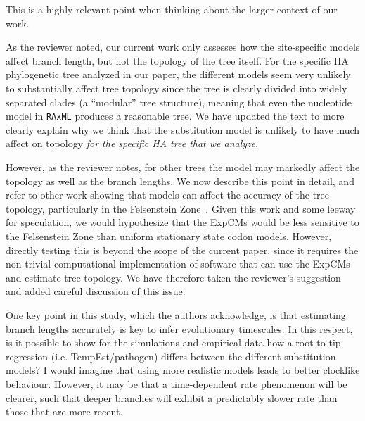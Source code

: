 \documentclass[11pt, oneside]{article}   	%
\newcommand{\response}[1]{{\color{black}#1}}
\begin{document}
\response{This is a highly relevant point when thinking about the larger context of our work. 

As the reviewer noted, our current work only assesses how the site-specific models affect branch length, but not the topology of the tree itself. 
For the specific HA phylogenetic tree analyzed in our paper, the different models seem very unlikely to substantially affect tree topology since the tree is clearly divided into widely separated clades (a ``modular'' tree structure), meaning that even the nucleotide model in \texttt{RAxML} produces a reasonable tree. 
We have updated the text to more clearly explain why we think that the substitution model is unlikely to have much affect on topology \emph{for the specific HA tree that we analyze}. 

However, as the reviewer notes, for other trees the model may markedly affect the topology as well as the branch lengths.
We now describe this point in detail, and refer to other work showing that models can affect the accuracy of the tree topology, particularly in the Felsenstein Zone~\citep{lartillot2007suppression}. 
Given this work and some leeway for speculation, we would hypothesize that the ExpCMs would be less sensitive to the Felsenstein Zone than uniform stationary state codon models.
However, directly testing this is beyond the scope of the current paper, since it requires the non-trivial computational implementation of software that can use the ExpCMs and estimate tree topology.
We have therefore taken the reviewer's suggestion and added careful discussion of this issue.
}

One key point in this study, which the authors acknowledge, is that estimating branch lengths accurately is key to infer evolutionary timescales. 
In this respect, is it possible to show for the simulations and empirical data how a root-to-tip regression (i.e. TempEst/pathogen) differs between the different substitution models? 
I would imagine that using more realistic models leads to better clocklike behaviour. 
However, it may be that a time-dependent rate phenomenon will be clearer, such that deeper branches will exhibit a predictably slower rate than those that are more recent. 
\end{document}
